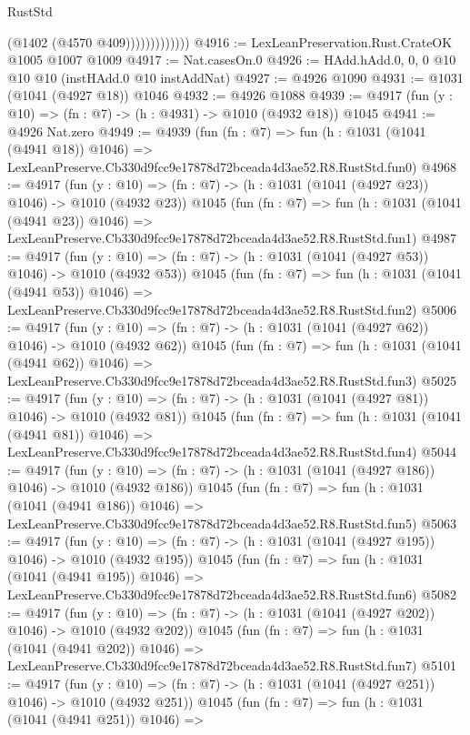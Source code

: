 \begin{lexlean}{RustStd}
\begin{coremodule}
                          (@1402 (@4570 @409)))))))))))))
@4916 := LexLeanPreservation.Rust.CrateOK @1005 @1007 @1009
@4917 := Nat.casesOn.{0}
@4926 := HAdd.hAdd.{0, 0, 0} @10 @10 @10 (instHAdd.{0} @10 instAddNat)
@4927 := @4926 @1090
@4931 := @1031 (@1041 (@4927 @18)) @1046
@4932 := @4926 @1088
@4939 := @4917 (fun (y : @10) => (fn : @7) -> (h : @4931) -> @1010 (@4932 @18)) @1045
@4941 := @4926 Nat.zero
@4949 := @4939
    (fun (fn : @7) =>
    fun (h : @1031 (@1041 (@4941 @18)) @1046) =>
    LexLeanPreserve.Cb330d9fcc9e17878d72bceada4d3ae52.R8.RustStd.fun0)
@4968 := @4917
    (fun (y : @10) => (fn : @7) -> (h : @1031 (@1041 (@4927 @23)) @1046) -> @1010 (@4932 @23))
    @1045
    (fun (fn : @7) =>
    fun (h : @1031 (@1041 (@4941 @23)) @1046) =>
    LexLeanPreserve.Cb330d9fcc9e17878d72bceada4d3ae52.R8.RustStd.fun1)
@4987 := @4917
    (fun (y : @10) => (fn : @7) -> (h : @1031 (@1041 (@4927 @53)) @1046) -> @1010 (@4932 @53))
    @1045
    (fun (fn : @7) =>
    fun (h : @1031 (@1041 (@4941 @53)) @1046) =>
    LexLeanPreserve.Cb330d9fcc9e17878d72bceada4d3ae52.R8.RustStd.fun2)
@5006 := @4917
    (fun (y : @10) => (fn : @7) -> (h : @1031 (@1041 (@4927 @62)) @1046) -> @1010 (@4932 @62))
    @1045
    (fun (fn : @7) =>
    fun (h : @1031 (@1041 (@4941 @62)) @1046) =>
    LexLeanPreserve.Cb330d9fcc9e17878d72bceada4d3ae52.R8.RustStd.fun3)
@5025 := @4917
    (fun (y : @10) => (fn : @7) -> (h : @1031 (@1041 (@4927 @81)) @1046) -> @1010 (@4932 @81))
    @1045
    (fun (fn : @7) =>
    fun (h : @1031 (@1041 (@4941 @81)) @1046) =>
    LexLeanPreserve.Cb330d9fcc9e17878d72bceada4d3ae52.R8.RustStd.fun4)
@5044 := @4917
    (fun (y : @10) => (fn : @7) -> (h : @1031 (@1041 (@4927 @186)) @1046) -> @1010 (@4932 @186))
    @1045
    (fun (fn : @7) =>
    fun (h : @1031 (@1041 (@4941 @186)) @1046) =>
    LexLeanPreserve.Cb330d9fcc9e17878d72bceada4d3ae52.R8.RustStd.fun5)
@5063 := @4917
    (fun (y : @10) => (fn : @7) -> (h : @1031 (@1041 (@4927 @195)) @1046) -> @1010 (@4932 @195))
    @1045
    (fun (fn : @7) =>
    fun (h : @1031 (@1041 (@4941 @195)) @1046) =>
    LexLeanPreserve.Cb330d9fcc9e17878d72bceada4d3ae52.R8.RustStd.fun6)
@5082 := @4917
    (fun (y : @10) => (fn : @7) -> (h : @1031 (@1041 (@4927 @202)) @1046) -> @1010 (@4932 @202))
    @1045
    (fun (fn : @7) =>
    fun (h : @1031 (@1041 (@4941 @202)) @1046) =>
    LexLeanPreserve.Cb330d9fcc9e17878d72bceada4d3ae52.R8.RustStd.fun7)
@5101 := @4917
    (fun (y : @10) => (fn : @7) -> (h : @1031 (@1041 (@4927 @251)) @1046) -> @1010 (@4932 @251))
    @1045
    (fun (fn : @7) =>
    fun (h : @1031 (@1041 (@4941 @251)) @1046) =>

\end{coremodule}
\end{lexlean}
